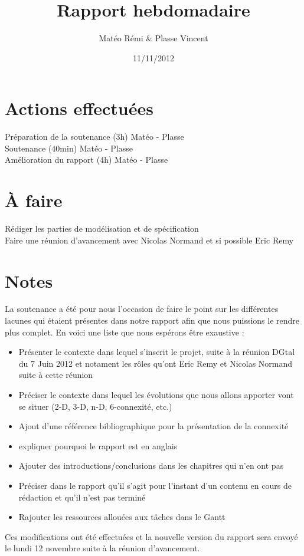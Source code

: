 \documentclass{article}
\title{Rapport hebdomadaire}
\author{Matéo Rémi \& Plasse Vincent}
\date{11/11/2012}
\begin{document}
\maketitle

\section{Actions effectuées}
Préparation de la soutenance (3h) Matéo - Plasse \\
Soutenance (40min) Matéo - Plasse \\
Amélioration du rapport (4h) Matéo - Plasse  \\


\section{À faire}
Rédiger les parties de modélisation et de spécification \\
Faire une réunion d'avancement avec Nicolas Normand et si possible Eric Remy\\

\section{Notes}
La soutenance a été pour nous l'occasion de faire le point sur les différentes lacunes qui étaient présentes dans notre rapport afin que nous puissions le rendre plus complet. En voici une liste que nous espérons être exaustive :
\begin{itemize}
	\item Présenter le contexte dans lequel s'inscrit le projet, suite à la réunion DGtal du 7 Juin 2012 et notament les rôles qu'ont Eric Remy et Nicolas Normand suite à cette réunion
	\item Préciser le contexte dans lequel les évolutions que nous allons apporter vont se situer (2-D, 3-D, n-D, 6-connexité, etc.)
	\item Ajout d'une référence bibliographique pour la présentation de la connexité
	\item expliquer pourquoi le rapport est en anglais
	\item Ajouter des introductions/conclusions dans les chapitres qui n'en ont pas
	\item Préciser dans le rapport qu'il s'agit pour l'instant d'un contenu en cours de rédaction et qu'il n'est pas terminé
	\item Rajouter les ressources allouées aux tâches dans le Gantt
\end{itemize}
Ces modifications ont été effectuées et la nouvelle version du rapport sera envoyé le lundi 12 novembre suite à la réunion d'avancement.
\end{document}
